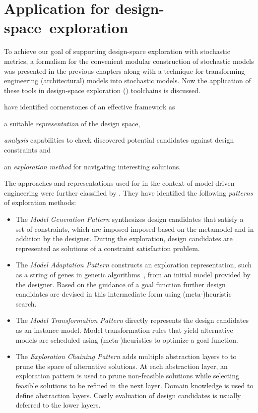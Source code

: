 \chapter{Application for design-space~exploration}
\label{chap:apply}

To achieve our goal of supporting design-space exploration with stochastic metrics, a formalism for the convenient modular construction of stochastic models was presented in the previous chapters along with a technique for transforming engineering (architectural) models into stochastic models. Now the application of these tools in design-space exploration () toolchains is discussed.

\citet{Kang10effective} have identified cornerstones of an effective  framework as
\begin{inparaenum}
\item a suitable \emph{representation} of the design space,
\item \emph{analysis} capabilities to check discovered potential candidates against design constraints and
\item an \emph{exploration method} for navigating interesting solutions.
\end{inparaenum}
The approaches and representations used for  in the context of model-driven engineering were further classified by \citet{Vanherpen14patterns}. They have identified the following \emph{ patterns} of exploration methods:
\begin{itemize}
\item The \emph{Model Generation Pattern} synthesizes design candidates that satisfy a set of constraints, which are imposed imposed based on the metamodel and in addition by the designer. During the exploration, design candidates are represented as solutions of a constraint satisfaction problem.
\item The \emph{Model Adaptation Pattern} constructs an exploration representation, such as a string of genes in genetic algorithms~, from an initial model provided by the designer. Based on the guidance of a goal function further design candidates are devised in this intermediate form using (meta-)heuristic search.
\item The \emph{Model Transformation Pattern} directly represents the design candidates as an instance model. Model transformation rules that yield alternative models are scheduled using (meta-)heuristics to optimize a goal function.
\item The \emph{Exploration Chaining Pattern} adds multiple abstraction layers to  to prune the space of alternative solutions. At each abstraction layer, an exploration pattern is used to prune non-feasible solutions while selecting feasible solutions to be refined in the next layer. Domain knowledge is used to define abstraction layers. Costly evaluation of design candidates is usually deferred to the lower layers.
\end{itemize}
